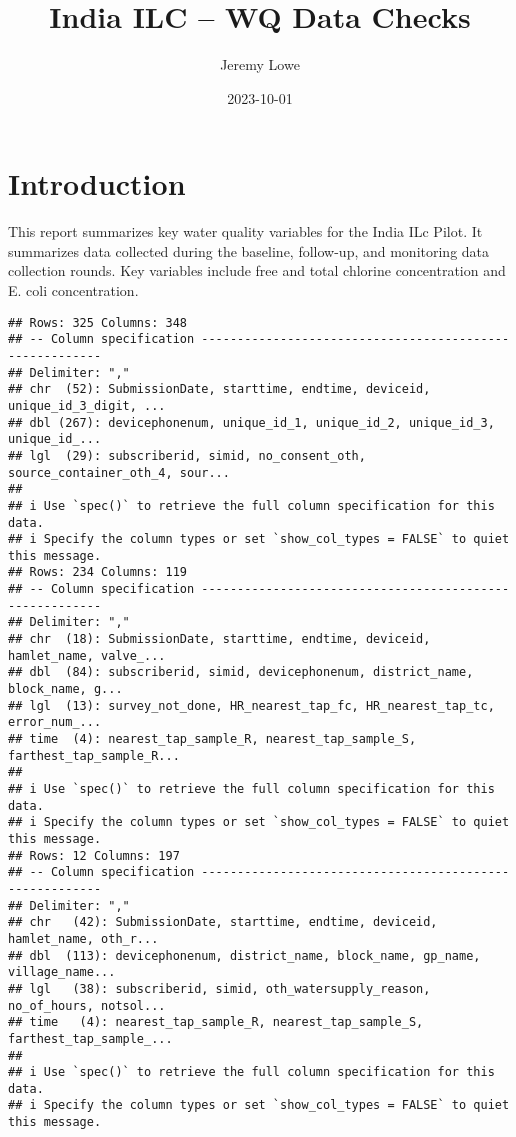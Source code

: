 \documentclass[
]{article}
\title{India ILC -- WQ Data Checks}
\author{Jeremy Lowe}
\date{2023-10-01}
\begin{document}
\maketitle

\hypertarget{introduction}{%
\section{Introduction}\label{introduction}}

This report summarizes key water quality variables for the India ILc
Pilot. It summarizes data collected during the baseline, follow-up, and
monitoring data collection rounds. Key variables include free and total
chlorine concentration and E. coli concentration.

\begin{verbatim}
## Rows: 325 Columns: 348
## -- Column specification --------------------------------------------------------
## Delimiter: ","
## chr  (52): SubmissionDate, starttime, endtime, deviceid, unique_id_3_digit, ...
## dbl (267): devicephonenum, unique_id_1, unique_id_2, unique_id_3, unique_id_...
## lgl  (29): subscriberid, simid, no_consent_oth, source_container_oth_4, sour...
## 
## i Use `spec()` to retrieve the full column specification for this data.
## i Specify the column types or set `show_col_types = FALSE` to quiet this message.
## Rows: 234 Columns: 119
## -- Column specification --------------------------------------------------------
## Delimiter: ","
## chr  (18): SubmissionDate, starttime, endtime, deviceid, hamlet_name, valve_...
## dbl  (84): subscriberid, simid, devicephonenum, district_name, block_name, g...
## lgl  (13): survey_not_done, HR_nearest_tap_fc, HR_nearest_tap_tc, error_num_...
## time  (4): nearest_tap_sample_R, nearest_tap_sample_S, farthest_tap_sample_R...
## 
## i Use `spec()` to retrieve the full column specification for this data.
## i Specify the column types or set `show_col_types = FALSE` to quiet this message.
## Rows: 12 Columns: 197
## -- Column specification --------------------------------------------------------
## Delimiter: ","
## chr   (42): SubmissionDate, starttime, endtime, deviceid, hamlet_name, oth_r...
## dbl  (113): devicephonenum, district_name, block_name, gp_name, village_name...
## lgl   (38): subscriberid, simid, oth_watersupply_reason, no_of_hours, notsol...
## time   (4): nearest_tap_sample_R, nearest_tap_sample_S, farthest_tap_sample_...
## 
## i Use `spec()` to retrieve the full column specification for this data.
## i Specify the column types or set `show_col_types = FALSE` to quiet this message.

\end{verbatim}
\end{document}
